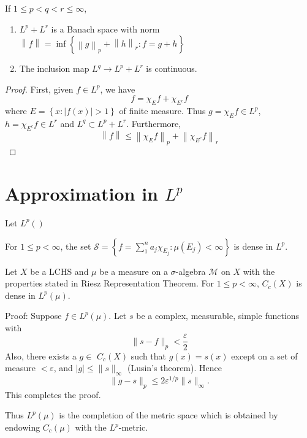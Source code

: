 \documentclass[12pt, a4paper, oneside]{book}
\begin{document}
\begin{proposition}
    If $1 \leq p<q<r \leq \infty$,
    \begin{enumerate}
        \item
              $ L^p+L^r$ is a Banach space with norm
              $\left\| f \right\|_{}=\inf \left\{\left\| g \right\|_{p}+\left\| h  \right\|_{r} :f=g+h\right\}$
        \item
              The inclusion map $L^q \rightarrow L^p+L^r$ is continuous.
    \end{enumerate}
    \begin{proof}
        First, given $f\in L^p$, we have
        \begin{equation*}
            f=\chi_E f +\chi_{E^c} f
        \end{equation*}
        where $E=\left\{x:\left|f(x)\right|>1\right\}$ of finite measure. Thus $g=\chi_E f \in L^p$, $h=\chi_{E^c} f\in L^r$ and $L^q \subset L^p+L^r$.
        Furthermore,
        \begin{equation*}
            \left\| f \right\|_{}\leq \left\| \chi_E f  \right\|_{p}+\left\| \chi_{E^c} f \right\|_{r}
        \end{equation*}
    \end{proof}
\end{proposition}



\section{Approximation in \texorpdfstring{$L^p$}{}}
Let $L^p\left(\right)$

\begin{theorem}
    For $1\leq p < \infty$, the set
    $\mathcal{S}=\left\{f=\sum_1^n a_j \chi_{E_j}: \mu\left(E_j\right)<\infty \right\}$  is dense in $L^{p}$.
\end{theorem}

\begin{theorem}
    Let $X$ be a LCHS and $\mu$ be a measure on a $\sigma$-algebra $\mathcal{M}$ on $X$ with the properties stated in Riesz Representation Theorem.
    For $1 \leq p<\infty$, $C_{c}(X)$ is dense in $L^p(\mu)$.

    Proof:
    Suppose $f \in L^p(\mu)$.
    Let $s$ be a complex, measurable, simple functions with
    $$\|s-f\|_p < \frac{\varepsilon}{2}$$
    Also, there exists a $g \in$ $C_{c}(X)$ such that $g(x)=s(x)$ except on a set of measure $<\varepsilon$, and $|g| \leq\|s\|_{\infty}$ (Lusin's theorem). Hence
    $$
        \|g-s\|_{p} \leq 2 \varepsilon^{1 / p}\|s\|_{\infty} .
    $$
    This completes the proof.

    Thus $L^p (\mu)$ is the completion of the metric space which is obtained by endowing $C_{c} (\mu)$ with the $L^{p}$-metric.
\end{theorem}
\end{document}
